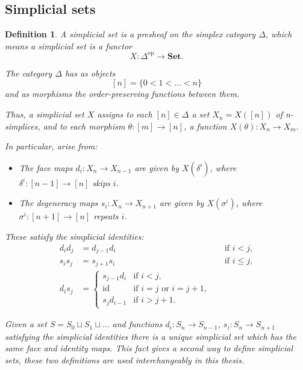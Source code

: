\documentclass[12pt]{article}
\newtheorem{definition}{Definition}[section]
\newcommand{\1}{\mathbbm{1}}
\begin{document}
\subsection{Simplicial sets}
\begin{definition}
    A \emph{simplicial set} is a presheaf on the simplex category \( \Delta \), which means a simplicial set is a functor
    \[
    X \colon \Delta^{\mathrm{op}} \to \mathbf{Set}.
    \]
    
    The category \( \Delta \) has as objects
    \[
    [n] = \{0 < 1 < \dots < n\}
    \]
    and as morphisms the order-preserving functions between them.
    
    Thus, a simplicial set \( X \) assigns to each \( [n] \in \Delta \) a set \( X_n = X([n]) \) of \emph{n-simplices}, and to each morphism \( \theta \colon [m] \to [n] \), a function \( X(\theta) \colon X_n \to X_m \).
    
    In particular, arise from:
    \begin{itemize}
      \item The \emph{face maps} \( d_i \colon X_n \to X_{n-1} \) are given by \( X(\delta^i) \), where \( \delta^i \colon [n-1] \to [n] \) skips \( i \).
      \item The \emph{degeneracy maps} \( s_i \colon X_n \to X_{n+1} \) are given by \( X(\sigma^i) \), where \( \sigma^i \colon [n+1] \to [n] \) repeats \( i \).
    \end{itemize}
    
    These satisfy the \emph{simplicial identities}:
    \[
    \begin{aligned}
    d_i d_j &= d_{j-1} d_i && \text{if } i < j, \\
    s_i s_j &= s_{j+1} s_i && \text{if } i \leq j, \\
    d_i s_j &=
    \begin{cases}
    s_{j-1} d_i & \text{if } i < j, \\
    \mathrm{id} & \text{if } i = j \text{ or } i = j+1, \\
    s_j d_{i-1} & \text{if } i > j+1.
    \end{cases}
    \end{aligned}
    \]

    Given a set $S = S_0 \sqcup S_1 \sqcup \dots$ and functions $d_i: S_n\to S_{n-1}$, $s_i: S_n \to S_{n+1}$ satisfying the simplicial identities there is a unique simplicial set which has the same face and identity maps. This fact gives a second way to define simplicial sets, these two definitions are used interchangeably in this thesis.
\end{definition}
\end{document}
